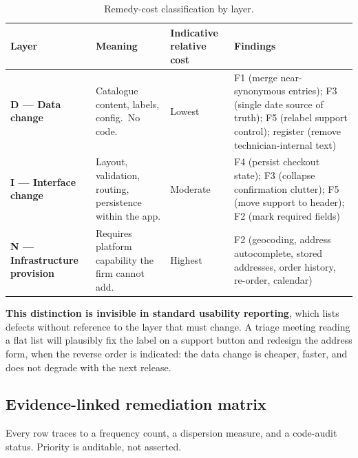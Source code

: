 \documentclass[]{interact}
\theoremstyle{plain}
\begin{document}
\begin{table}[htbp]
\caption{Remedy-cost classification by layer.}
\label{tab:layers}
\begin{tabular}{@{}p{} p{} p{} p{}@{}}
\toprule
\textbf{Layer} & \textbf{Meaning} & \textbf{Indicative relative cost} & \textbf{Findings} \\
\midrule
\textbf{D --- Data change} & Catalogue content, labels, config.\ No code. & Lowest & F1 (merge near-synonymous entries); F3 (single date source of truth); F5 (relabel support control); register (remove technician-internal text) \\
\textbf{I --- Interface change} & Layout, validation, routing, persistence within the app. & Moderate & F4 (persist checkout state); F3 (collapse confirmation clutter); F5 (move support to header); F2 (mark required fields) \\
\textbf{N --- Infrastructure provision} & Requires platform capability the firm cannot add. & Highest & F2 (geocoding, address autocomplete, stored addresses, order history, re-order, calendar) \\
\bottomrule
\end{tabular}
\end{table}

\textbf{This distinction is invisible in standard usability reporting}, which lists defects without
reference to the layer that must change. A triage meeting reading a flat list will plausibly fix the
label on a support button and redesign the address form, when the reverse order is indicated: the data
change is cheaper, faster, and does not degrade with the next release.

\subsection{Evidence-linked remediation matrix}

Every row traces to a frequency count, a dispersion measure, and a code-audit status. Priority is
auditable, not asserted.
\end{document}
